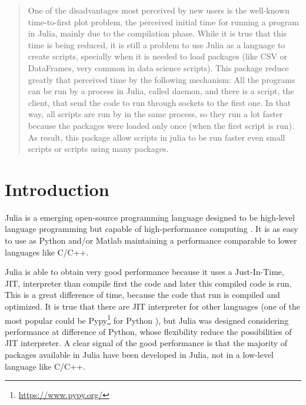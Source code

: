 \documentclass{juliacon}
\begin{document}


\maketitle

\begin{abstract}

  One of the disadvantages most perceived by new users is the well-known
  time-to-first plot problem, the perceived initial time for running a program
  in Julia, mainly due to the compilation phase. While it is true that this time
  is being reduced, it is still a problem to use Julia as a language to create
  scripts, specially when it is needed to load packages (like CSV or DataFrames,
  very common in data science scripts). This package reduce greatly that
  perceived time by the following mechanism: All the programs can be run by a
  process in Julia, called daemon, and there is a script, the client, that send
  the code to run through sockets to the first one. In that way, all scripts are
  run by in the same process, so they run a lot faster because the packages were
  loaded only once (when the first script is run). As result, this package allow
  scripts in julia to be run faster even small scripts or scripts using many
  packages.
\end{abstract}

\section{Introduction}

Julia is a emerging open-source programming language designed to be high-level
language programming but capable of high-performance computing
\cite{bezansonJuliaFreshApproach2017a}. It is as easy to use as Python and/or Matlab
maintaining a performance comparable to lower languages like C/C++.

Julia is able to obtain very good performance because it uses a Just-In-Time,
JIT, interpreter than compile first the code and later this compiled code is
run. This is a great difference of time, because the code that run is compiled
and optimized. It is true that there are JIT interpreter for other languages
(one of the most popular could be Pypy\footnote{\url{https://www.pypy.org/}} for
Python \cite{liAssessingOptimizingPerformance2019}), but Julia was designed
considering performance at difference of Python, whose flexibility reduce the
possibilities of JIT interpreter. A clear signal of the good performance is
that the majority of packages available in Julia have been developed in Julia,
not in a low-level language like C/C++.
\end{document}
